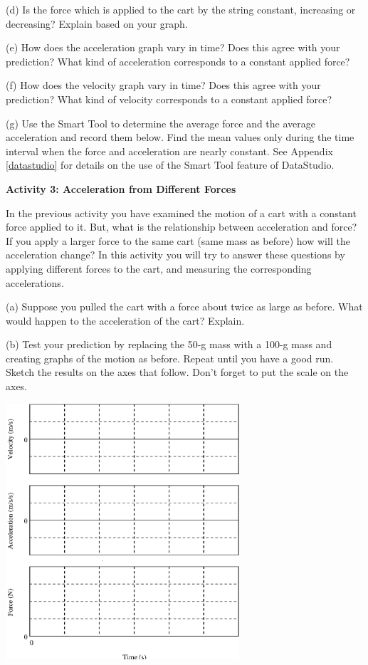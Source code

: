(d) Is the force which is applied to the cart by the string constant, increasing
or decreasing? Explain based on your graph.
\answerspace{15mm}

\pagebreak[2]
(e) How does the acceleration graph vary in time? Does this agree with your
prediction? What kind of acceleration corresponds to a constant applied force?
\answerspace{20mm}

(f) How does the velocity graph vary in time? Does this agree with your prediction?
What kind of velocity corresponds to a constant applied force?
\answerspace{20mm}

(g) Use the Smart Tool to determine the average force and the average acceleration
and record them below. Find the mean values only during the time interval when
the force and acceleration are nearly constant. See Appendix \ref{datastudio} for details on
the use of the Smart Tool feature of DataStudio.
\answerspace{20mm}

\textbf{Activity 3: Acceleration from Different Forces }

In the previous activity you have examined the motion of a cart with a constant
force applied to it. But, what is the relationship between acceleration and
force? If you apply a larger force to the same cart (same mass as before) how
will the acceleration change? In this activity you will try to answer these
questions by applying different forces to the cart, and measuring the corresponding
accelerations. 

(a) Suppose you pulled the cart with a force about twice as large as before.
What would happen to the acceleration of the cart? Explain.
\answerspace{20mm}

\pagebreak[3]
(b) Test your prediction by replacing the 50-g mass with a 100-g mass and creating graphs of the motion as before. Repeat until you have a good run. Sketch the
results on the axes that follow. Don't forget to put the scale on the axes.

\vspace{0.3cm}
{\par\centering \includegraphics[width=0.65\textwidth]{force1/force1_fig5.eps} \par}
\vspace{0.3cm}

